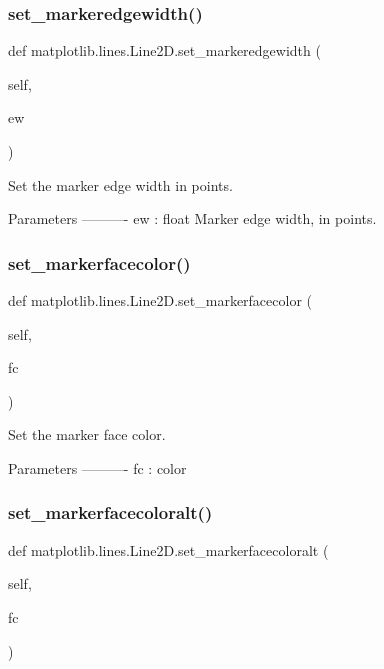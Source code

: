 \subsubsection{\texorpdfstring{set\+\_\+markeredgewidth()}{set\_markeredgewidth()}}
{\footnotesize\ttfamily def matplotlib.\+lines.\+Line2\+D.\+set\+\_\+markeredgewidth (\begin{DoxyParamCaption}\item[{}]{self,  }\item[{}]{ew }\end{DoxyParamCaption})}

\begin{DoxyVerb}Set the marker edge width in points.

Parameters
----------
ew : float
     Marker edge width, in points.
\end{DoxyVerb}
 \mbox{\label{classmatplotlib_1_1lines_1_1Line2D_af321f29912420994752574b83de7ef87}} 
\subsubsection{\texorpdfstring{set\+\_\+markerfacecolor()}{set\_markerfacecolor()}}
{\footnotesize\ttfamily def matplotlib.\+lines.\+Line2\+D.\+set\+\_\+markerfacecolor (\begin{DoxyParamCaption}\item[{}]{self,  }\item[{}]{fc }\end{DoxyParamCaption})}

\begin{DoxyVerb}Set the marker face color.

Parameters
----------
fc : color
\end{DoxyVerb}
 \mbox{\label{classmatplotlib_1_1lines_1_1Line2D_a46df151e4fa4f29f2d7575ee2837b5bb}} 
\subsubsection{\texorpdfstring{set\+\_\+markerfacecoloralt()}{set\_markerfacecoloralt()}}
{\footnotesize\ttfamily def matplotlib.\+lines.\+Line2\+D.\+set\+\_\+markerfacecoloralt (\begin{DoxyParamCaption}\item[{}]{self,  }\item[{}]{fc }\end{DoxyParamCaption})}

